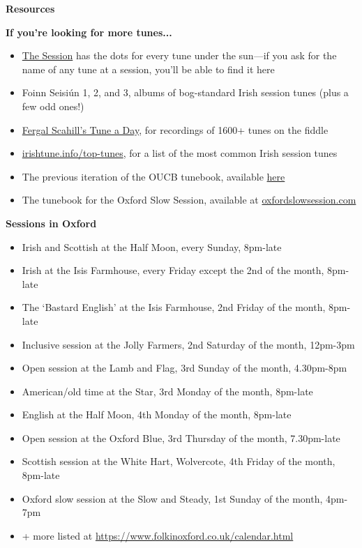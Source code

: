 \documentclass[11pt]{article}
\begin{document}
\vspace{2\baselineskip}

\centerline{\Large\textbf{Resources}}
\textbf{If you're looking for more tunes...}
\begin{itemize}
    \item \href{https://thesession.org/}{The Session} has the dots for every tune under the sun---if you ask for the name of any tune at a session, you'll be able to find it here
    \item Foinn Seisi\'un 1, 2, and 3, albums of bog-standard Irish session tunes (plus a few odd ones!)
    \item \href{https://youtube.com/playlist?list=PL8B7WrVadMy6TUR_PLEKXhglaretoOnHy&si=mwThMCrgtDoPArmO}{Fergal Scahill's Tune a Day}, for recordings of 1600+ tunes on the fiddle
    \item \href{https://www.irishtune.info/top-tunes/}{irishtune.info/top-tunes}, for a list of the most common Irish session tunes
    \item The previous iteration of the OUCB tunebook, available \href{...}{here}
    \item The tunebook for the Oxford Slow Session, available at \href{https://oxfordslowsession.com/}{oxfordslowsession.com}
\end{itemize}

\textbf{Sessions in Oxford}
\begin{itemize}
    \item Irish and Scottish at the Half Moon, every Sunday, 8pm-late
    \item Irish at the Isis Farmhouse, every Friday except the 2nd of the month, 8pm-late
    \item The `Bastard English' at the Isis Farmhouse, 2nd Friday of the month, 8pm-late
    \item Inclusive session at the Jolly Farmers, 2nd Saturday of the month, 12pm-3pm
    \item Open session at the Lamb and Flag, 3rd Sunday of the month, 4.30pm-8pm
    \item American/old time at the Star, 3rd Monday of the month, 8pm-late
    \item English at the Half Moon, 4th Monday of the month, 8pm-late
    \item Open session at the Oxford Blue, 3rd Thursday of the month, 7.30pm-late
    \item Scottish session at the White Hart, Wolvercote, 4th Friday of the month, 8pm-late
    \item Oxford slow session at the Slow and Steady, 1st Sunday of the month, 4pm-7pm
    \item + more listed at \url{https://www.folkinoxford.co.uk/calendar.html}
\end{itemize}
\clearpage
\end{document}
